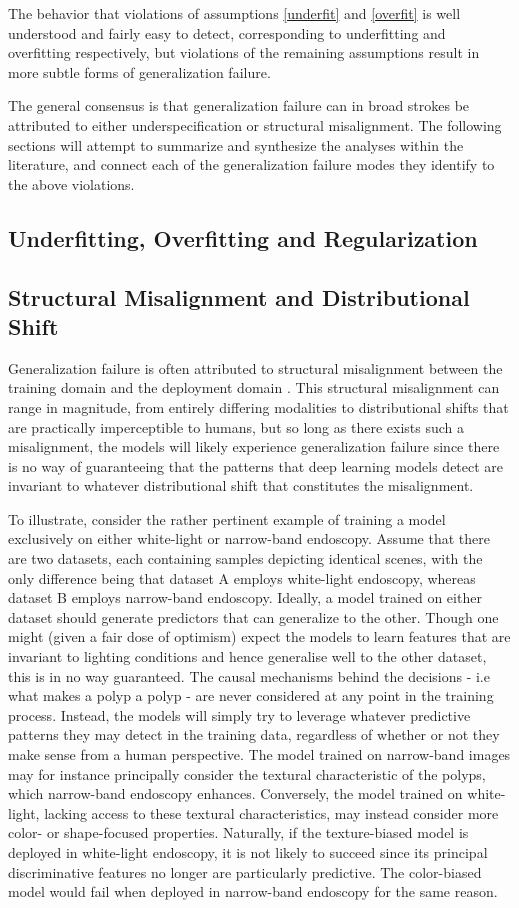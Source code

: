 		The behavior that violations of assumptions \ref{underfit} and \ref{overfit} is well understood and fairly easy to detect, corresponding to underfitting and overfitting respectively, but violations of the remaining assumptions result in more subtle forms of generalization failure. 
		
		The general consensus is that generalization
		failure can in broad strokes be attributed to either underspecification or structural misalignment. The following sections will attempt to summarize and synthesize the analyses within the literature, and connect each of the generalization
		failure modes they identify to the above violations.
		\subsection{Underfitting, Overfitting and Regularization}
		\subsection{Structural Misalignment and Distributional Shift}
		Generalization failure is often attributed to structural misalignment between the training domain and the deployment domain \cite{adversarial_bugs_features,shortcut_learning,IRM}. This structural misalignment can range in magnitude, from entirely differing modalities to distributional shifts that are practically imperceptible to humans, but so long as there exists such a misalignment, the models will likely experience generalization failure since there is no way of guaranteeing that the patterns that deep learning models detect are invariant to whatever distributional shift that constitutes the misalignment. 
		
		To illustrate, consider the rather pertinent example of training a model exclusively on either white-light or narrow-band endoscopy. Assume that there are two datasets, each containing samples depicting identical scenes, with the only difference being that dataset A employs white-light endoscopy, whereas dataset B employs narrow-band endoscopy. Ideally, a model trained on either dataset should generate predictors that can generalize to the other. Though one might (given a fair dose of optimism) expect the models to learn features that are invariant to lighting conditions and hence generalise well to the other dataset, this is in no way guaranteed. The causal mechanisms behind the decisions - i.e what makes a polyp a polyp - are never considered at any point in the training process. Instead, the models will simply try to leverage whatever predictive patterns they may detect in the training data, regardless of whether or not they make sense from a human perspective. The model trained on narrow-band images may for instance principally consider the textural characteristic of the polyps, which narrow-band endoscopy enhances. Conversely, the model trained on white-light, lacking access to these textural characteristics, may instead consider more color- or shape-focused properties. Naturally, if the texture-biased model is deployed in white-light endoscopy, it is not likely to succeed since its principal discriminative features no longer are particularly predictive. The color-biased model would fail when deployed in narrow-band endoscopy for the same reason. 

